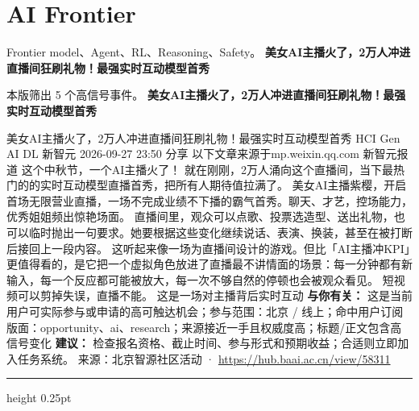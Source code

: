 \documentclass[10.5pt]{ctexart}
\begin{document}
\section*{AI Frontier}
{\color{ormuted} Frontier model、Agent、RL、Reasoning、Safety。}
\vspace{2mm}
{\LARGE\bfseries 美女AI主播火了，2万人冲进直播间狂刷礼物！最强实时互动模型首秀}\par
\vspace{1mm}
{\color{ormuted} 本版筛出 5 个高信号事件。}
\vspace{3mm}
{\Large\bfseries 美女AI主播火了，2万人冲进直播间狂刷礼物！最强实时互动模型首秀}\par
美女AI主播火了，2万人冲进直播间狂刷礼物！最强实时互动模型首秀 HCI Gen AI DL 新智元 2026-09-27 23:50 分享 以下文章来源于mp.weixin.qq.com 新智元报道 这个中秋节，一个AI主播火了！ 就在刚刚，2万人涌向这个直播间，当下最热门的的实时互动模型直播首秀，把所有人期待值拉满了。 美女AI主播紫樱，开启首场无限营业直播，一场不完成业绩不下播的霸气首秀。聊天、才艺，控场能力，优秀姐姐频出惊艳场面。 直播间里，观众可以点歌、投票选造型、送出礼物，也可以临时抛出一句要求。她要根据这些变化继续说话、表演、换装，甚至在被打断后接回上一段内容。 这听起来像一场为直播间设计的游戏。但比「AI主播冲KPI」更值得看的，是它把一个虚拟角色放进了直播最不讲情面的场景：每一分钟都有新输入，每一个反应都可能被放大，每一次不够自然的停顿也会被观众看见。 短视频可以剪掉失误，直播不能。 这是一场对主播背后实时互动
\textbf{与你有关：} 这是当前用户可实际参与或申请的高可触达机会；参与范围：北京 / 线上；命中用户订阅版面：opportunity、ai、research；来源接近一手且权威度高；标题/正文包含高信号变化
\textbf{建议：} 检查报名资格、截止时间、参与形式和预期收益；合适则立即加入任务系统。
{\footnotesize\color{ormuted} 来源：北京智源社区活动 · \url{https://hub.baai.ac.cn/view/58311}}
\vspace{4mm}
\hrule height 0.25pt
\vspace{3mm}
\end{document}
